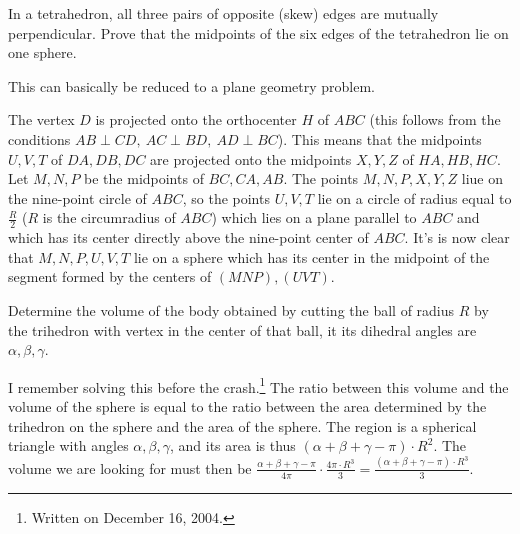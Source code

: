 \documentclass[12pt,a4paper]{memoir}
\theoremstyle{definition}
\begin{document}
\begin{question}[name={1959--1966 IMO Longlist}]
	In a tetrahedron, all three pairs of opposite (skew) edges are mutually perpendicular. Prove that the midpoints of the six edges of the tetrahedron lie on one sphere.
\end{question}

\begin{solution}[name={Solution by Grobber}]
	This can basically be reduced to a plane geometry problem.
	
	The vertex $D$ is projected onto the orthocenter $H$ of $ABC$ (this follows from the conditions $AB\perp CD,\ AC\perp BD,\ AD\perp BC$). This means that the midpoints $U,V,T$ of $DA,DB,DC$ are projected onto the midpoints $X,Y,Z$ of $HA,HB,HC$. Let $M,N,P$ be the midpoints of $BC,CA,AB$. The points $M,N,P,X,Y,Z$ liue on the nine-point circle of $ABC$, so the points $U,V,T$ lie on a circle of radius equal to $\frac R2$ ($R$ is the circumradius of $ABC$) which lies on a plane parallel to $ABC$ and which has its center directly above the nine-point center of $ABC$. It's is now clear that $M,N,P,U,V,T$ lie on a sphere which has its center in the midpoint of the segment formed by the centers of $(MNP),(UVT)$.
\end{solution}




\begin{question}[name={1967 IMO Longlist}]
	Determine the volume of the body obtained by cutting the ball of radius $R$ by the trihedron with vertex in the center of that ball, it its dihedral angles are $\alpha, \beta, \gamma.$
\end{question}

\begin{solution}[name={Solution by Grobber}] 
	I remember solving this before the crash.\footnote{Written on December 16, 2004.}
	The ratio between this volume and the volume of the sphere is equal to the ratio between the area determined by the trihedron on the sphere and the area of the sphere. The region is a spherical triangle with angles $\alpha,\beta,\gamma$, and its area is thus $(\alpha+\beta+\gamma-\pi)\cdot R^2$. The volume we are looking for must then be $\frac{\alpha+\beta+\gamma-\pi}{4\pi}\cdot \frac{4\pi\cdot R^3}3=\frac{(\alpha+\beta+\gamma-\pi)\cdot R^3}3$.	
\end{solution}
\end{document}
